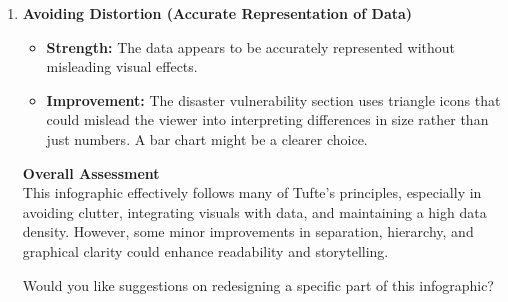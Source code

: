 \documentclass[11pt,a4paper,titlepage]{article}
\begin{document}
\begin{enumerate}
\begin{enumerate}
\begin{enumerate}
\begin{enumerate}
        \item \textbf{Avoiding Distortion (Accurate Representation of Data)}
        \begin{itemize}
            \item \textbf{Strength:} The data appears to be accurately represented without misleading visual effects.
            \item \textbf{Improvement:} The disaster vulnerability section uses triangle icons that could mislead the viewer into interpreting differences in size rather than just numbers. A bar chart might be a clearer choice.
        \end{itemize}

        \textbf{Overall Assessment} \\
        This infographic effectively follows many of Tufte’s principles, especially in avoiding clutter, integrating visuals with data, and maintaining a high data density. However, some minor improvements in separation, hierarchy, and graphical clarity could enhance readability and storytelling.

        Would you like suggestions on redesigning a specific part of this infographic?


\end{enumerate}
\end{enumerate}
\end{enumerate}
\end{enumerate}
\end{document}
